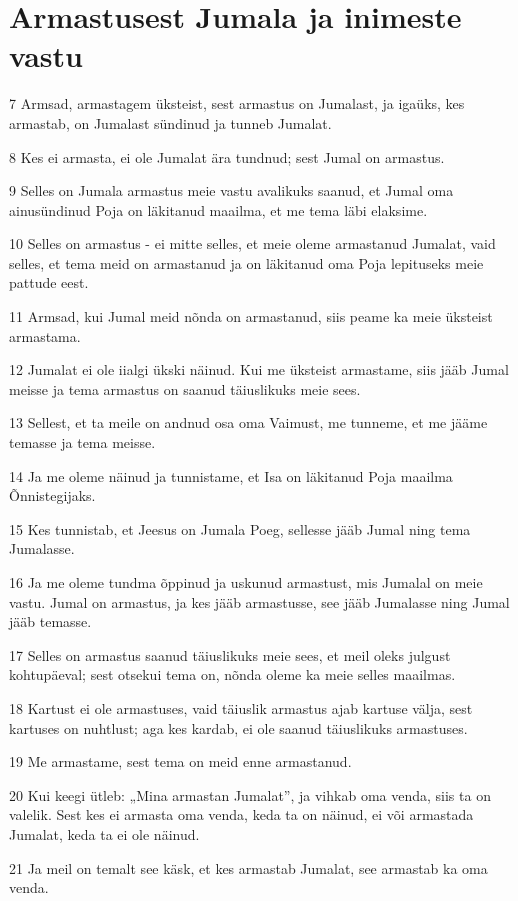 \section*{Armastusest Jumala ja inimeste vastu}

\par 7 Armsad, armastagem üksteist, sest armastus on Jumalast, ja igaüks, kes armastab, on Jumalast sündinud ja tunneb Jumalat.
\par 8 Kes ei armasta, ei ole Jumalat ära tundnud; sest Jumal on armastus.
\par 9 Selles on Jumala armastus meie vastu avalikuks saanud, et Jumal oma ainusündinud Poja on läkitanud maailma, et me tema läbi elaksime.
\par 10 Selles on armastus - ei mitte selles, et meie oleme armastanud Jumalat, vaid selles, et tema meid on armastanud ja on läkitanud oma Poja lepituseks meie pattude eest.
\par 11 Armsad, kui Jumal meid nõnda on armastanud, siis peame ka meie üksteist armastama.
\par 12 Jumalat ei ole iialgi ükski näinud. Kui me üksteist armastame, siis jääb Jumal meisse ja tema armastus on saanud täiuslikuks meie sees.
\par 13 Sellest, et ta meile on andnud osa oma Vaimust, me tunneme, et me jääme temasse ja tema meisse.
\par 14 Ja me oleme näinud ja tunnistame, et Isa on läkitanud Poja maailma Õnnistegijaks.
\par 15 Kes tunnistab, et Jeesus on Jumala Poeg, sellesse jääb Jumal ning tema Jumalasse.
\par 16 Ja me oleme tundma õppinud ja uskunud armastust, mis Jumalal on meie vastu. Jumal on armastus, ja kes jääb armastusse, see jääb Jumalasse ning Jumal jääb temasse.
\par 17 Selles on armastus saanud täiuslikuks meie sees, et meil oleks julgust kohtupäeval; sest otsekui tema on, nõnda oleme ka meie selles maailmas.
\par 18 Kartust ei ole armastuses, vaid täiuslik armastus ajab kartuse välja, sest kartuses on nuhtlust; aga kes kardab, ei ole saanud täiuslikuks armastuses.
\par 19 Me armastame, sest tema on meid enne armastanud.
\par 20 Kui keegi ütleb: „Mina armastan Jumalat”, ja vihkab oma venda, siis ta on valelik. Sest kes ei armasta oma venda, keda ta on näinud, ei või armastada Jumalat, keda ta ei ole näinud.
\par 21 Ja meil on temalt see käsk, et kes armastab Jumalat, see armastab ka oma venda.



